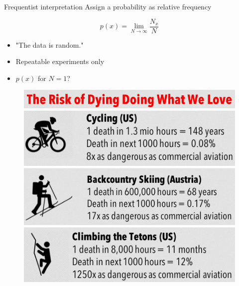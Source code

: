 \documentclass[
aspectratio=169,
14pt,
professionalfonts
]{beamer}
\begin{document}
\begin{frame}{Frequentist interpretation}
    Assign a probability as relative frequency
    \begin{minipage}{0.60\textwidth}
        $$
        p(x) = \lim_{N\to\infty} \frac{N_x}{N}
        $$

        \begin{itemize}
            \item "The data is random."
            \item Repeatable experiments only
            \item $p(x)$ for $N=1$?
        \end{itemize}
    \end{minipage}
    \begin{minipage}{0.39\textwidth}
        \begin{figure}
            \centering
            \includegraphics[width=\textwidth]{../plots/die-title.png}
            \includegraphics[width=\textwidth]{../plots/die-bike.png}
            \includegraphics[width=\textwidth]{../plots/die-ski.png}
            \includegraphics[width=\textwidth]{../plots/die-climbing.png}
        \end{figure}
    \end{minipage}
\end{frame}
\end{document}
